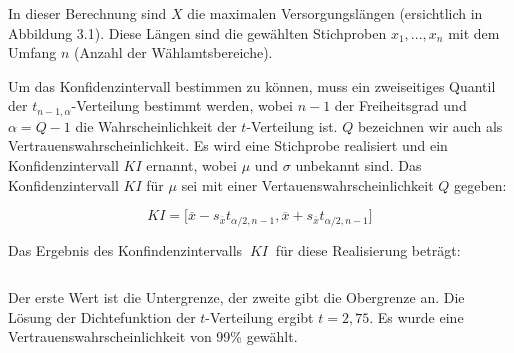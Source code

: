 \vspace{0.3cm}
In dieser Berechnung sind $X$ die maximalen Versorgungslängen (ersichtlich in Abbildung 3.1).
Diese Längen sind die gewählten Stichproben 
$x_{1},...,x_{n}$ mit dem Umfang $n$ (Anzahl der Wählamtsbereiche).

Um das Konfidenzintervall bestimmen zu können, muss ein zweiseitiges Quantil \\der $t_{n-1,\alpha}$-Verteilung bestimmt werden, wobei $n-1$ der 
Freiheitsgrad und $\alpha = Q-1$ die Wahrscheinlichkeit der $t$-Verteilung ist. $Q$ bezeichnen wir auch als Vertrauenswahrscheinlichkeit.
Es wird eine Stichprobe realisiert und ein Konfidenzintervall $KI$ ernannt, wobei $\mu$ und $\sigma$ unbekannt sind.
Das Konfidenzintervall $KI$ für $\mu$ sei mit einer Vertauenswahrscheinlichkeit $Q$ gegeben:

\vspace{0.3cm}

\begin{equation}
KI = \lbrack \overline x - s_{\overline x}t_{\alpha /2,n-1}, \overline x + s_{\overline x}t_{\alpha /2,n-1}\rbrack
\end{equation}

\vspace{0.3cm}

Das Ergebnis des Konfindenzintervalls $~KI~$ für diese Realisierung beträgt:

\begin{equation}
[573,360~m;1024,500~m] 
\end{equation}

Der erste Wert ist die Untergrenze, der zweite gibt die Obergrenze an.
Die Lösung der Dichtefunktion der $t$-Verteilung ergibt $t=2,75$\cite{bronstein}.
Es wurde eine Vertrauenswahrscheinlichkeit von 99\% gewählt. 


